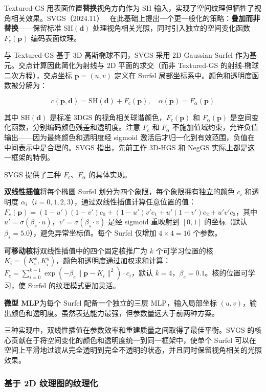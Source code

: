Textured-GS 用表面位置\textbf{替换}视角方向作为 SH 输入，实现了空间纹理但牺牲了视角相关效果。SVGS（2024.11）~\cite{2411_18966} 在此基础上提出一个更一般化的策略：\textbf{叠加而非替换}——保留标准 $\text{SH}(\mathbf{d})$ 处理视角相关光照，同时引入独立的空间变化函数 $F_c(\mathbf{p})$ 编码表面纹理。

与 Textured-GS 基于 3D 高斯椭球不同，SVGS 采用 2D Gaussian Surfel 作为基元。交点计算因此简化为射线与 2D 平面的求交（而非 Textured-GS 的射线-椭球二次方程），交点坐标 $\mathbf{p} = (u, v)$ 定义在 Surfel 局部坐标系中。颜色和透明度函数被分解为：

\begin{equation}
c(\mathbf{p}, \mathbf{d}) = \text{SH}(\mathbf{d}) + F_c(\mathbf{p}), \quad
\alpha(\mathbf{p}) = F_\alpha(\mathbf{p})
\end{equation}

其中 $\text{SH}(\mathbf{d})$ 是标准 3DGS 的视角相关球谐颜色，$F_c(\mathbf{p})$ 和 $F_\alpha(\mathbf{p})$ 是空间变化函数，分别编码颜色残差和透明度。注意 $F_c$ 和 $F_\alpha$ 不施加值域约束，允许负值输出——因为最终颜色和透明度经 sigmoid 激活后才归一化到有效范围，负值在中间表示中是合理的。SVGS 指出，先前工作 3D-HGS 和 NegGS 实际上都是这一框架的特例。

SVGS 提供了三种 $F_c$、$F_\alpha$ 的具体实现。

\textbf{双线性插值}将每个椭圆 Surfel 划分为四个象限，每个象限拥有独立的颜色 $c_i$ 和透明度 $\alpha_i$（$i=0,1,2,3$），通过双线性插值计算任意位置的值：$F_c(\mathbf{p}) = (1-u')(1-v')c_0 + (1-u')v'c_1 + u'(1-v')c_2 + u'v'c_3$，其中 $u' = \sigma(\beta_s \cdot u)$，$v' = \sigma(\beta_s \cdot v)$ 是经 sigmoid 重映射到 $[0,1]$ 的坐标（默认 $\beta_s = 5.0$），避免异常坐标值。每个 Surfel 仅增加 $4 \times 4 = 16$ 个参数。

\textbf{可移动核}将双线性插值中的四个固定核推广为 $k$ 个可学习位置的核 $K_i = (K_i^x, K_i^y)$，颜色和透明度通过加权求和计算：$F_c = \sum_{i=0}^{k-1} \exp(-\beta_e \| \mathbf{p} - K_i \|^2) \cdot c_i$，默认 $k=4$，$\beta_e = 0.1$。核的位置可学习，使 Surfel 的纹理模式更加灵活。

\textbf{微型 MLP}为每个 Surfel 配备一个独立的三层 MLP，输入局部坐标 $(u,v)$，输出颜色和透明度。虽然表达能力最强，但参数量远大于前两种方案。

三种实现中，双线性插值在参数效率和重建质量之间取得了最佳平衡。SVGS 的核心贡献在于将空间变化的颜色和透明度统一到同一框架中，使单个 Surfel 可以在空间上平滑地过渡从完全透明到完全不透明的状态，并且同时保留视角相关的光照效果。

\subsubsection{基于 2D 纹理图的纹理化}

